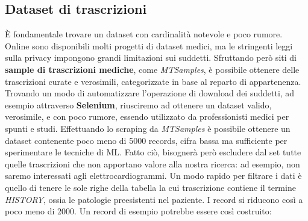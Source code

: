 \subsection{Dataset di trascrizioni}
È fondamentale trovare un dataset con cardinalità notevole e poco rumore. Online sono disponibili molti progetti di dataset medici, ma le stringenti leggi sulla privacy impongono grandi limitazioni sui suddetti. Sfruttando però siti di \textbf{sample di trascrizioni mediche}, come \textit{MTSamples}, è possibile ottenere delle trascrizioni curate e verosimili, categorizzate in base al reparto di appartenenza. Trovando un modo di automatizzare l'operazione di download dei suddetti, ad esempio attraverso \textbf{Selenium}, riusciremo ad ottenere un dataset valido, verosimile, e con poco rumore, essendo utilizzato da professionisti medici per spunti e studi. Effettuando lo scraping da \textit{MTSamples} è possibile ottenere un dataset contenente poco meno di 5000 records, cifra bassa ma sufficiente per sperimentare le tecniche di ML. Fatto ciò, bisognerà però escludere dal set tutte quelle trascrizioni che non apportano valore alla nostra ricerca: ad esempio, non saremo interessati agli elettrocardiogrammi. Un modo rapido per filtrare i dati è quello di tenere le sole righe della tabella la cui trascrizione contiene il termine \textit{HISTORY}, ossia le patologie preesistenti nel paziente. I record si riducono così a poco meno di 2000.
Un record di esempio potrebbe essere così costruito:
